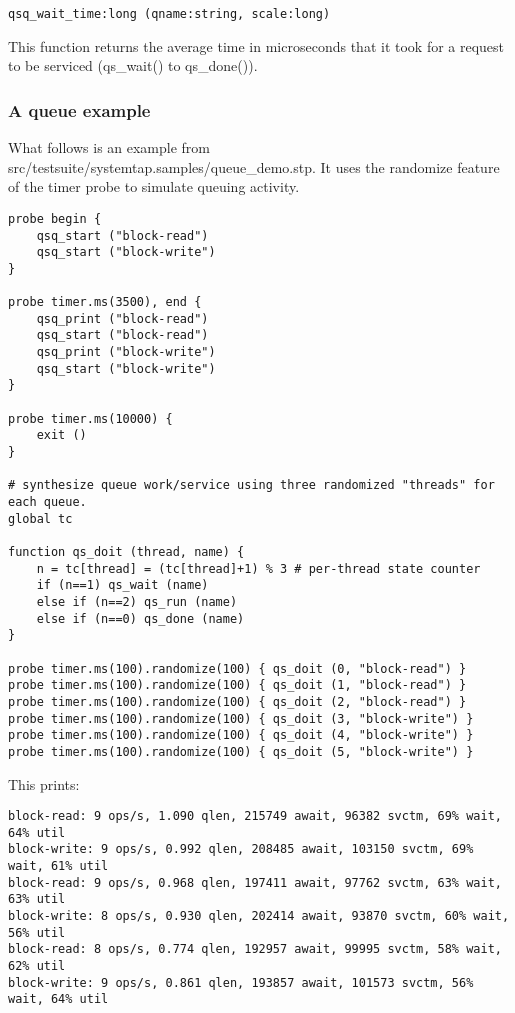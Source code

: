 \documentclass[twoside,english]{article}
\newenvironment{vindent}
{\begin{list}{}{\setlength{\listparindent}{6pt}}
\item[]}
{\end{list}}
\begin{document}
\begin{vindent}
\begin{verbatim}
qsq_wait_time:long (qname:string, scale:long)
\end{verbatim}
\end{vindent}
This function returns the average time in microseconds that it took for a
request to be serviced (qs\_wait() to qs\_done()).


\subsubsection{A queue example}

What follows is an example from src/testsuite/systemtap.samples/queue\_demo.stp.
It uses the randomize feature of the timer probe to simulate queuing activity.

\begin{vindent}
\begin{verbatim}
probe begin {
    qsq_start ("block-read")
    qsq_start ("block-write")
}

probe timer.ms(3500), end {
    qsq_print ("block-read")
    qsq_start ("block-read")
    qsq_print ("block-write")
    qsq_start ("block-write")
}

probe timer.ms(10000) {
    exit ()
}

# synthesize queue work/service using three randomized "threads" for each queue.
global tc

function qs_doit (thread, name) {
    n = tc[thread] = (tc[thread]+1) % 3 # per-thread state counter
    if (n==1) qs_wait (name)
    else if (n==2) qs_run (name)
    else if (n==0) qs_done (name)
}

probe timer.ms(100).randomize(100) { qs_doit (0, "block-read") }
probe timer.ms(100).randomize(100) { qs_doit (1, "block-read") }
probe timer.ms(100).randomize(100) { qs_doit (2, "block-read") }
probe timer.ms(100).randomize(100) { qs_doit (3, "block-write") }
probe timer.ms(100).randomize(100) { qs_doit (4, "block-write") }
probe timer.ms(100).randomize(100) { qs_doit (5, "block-write") }
\end{verbatim}
\end{vindent}
This prints:

\begin{vindent}
\begin{verbatim}
block-read: 9 ops/s, 1.090 qlen, 215749 await, 96382 svctm, 69% wait, 64% util
block-write: 9 ops/s, 0.992 qlen, 208485 await, 103150 svctm, 69% wait, 61% util
block-read: 9 ops/s, 0.968 qlen, 197411 await, 97762 svctm, 63% wait, 63% util
block-write: 8 ops/s, 0.930 qlen, 202414 await, 93870 svctm, 60% wait, 56% util
block-read: 8 ops/s, 0.774 qlen, 192957 await, 99995 svctm, 58% wait, 62% util
block-write: 9 ops/s, 0.861 qlen, 193857 await, 101573 svctm, 56% wait, 64% util
\end{verbatim}
\end{vindent}
\end{document}
